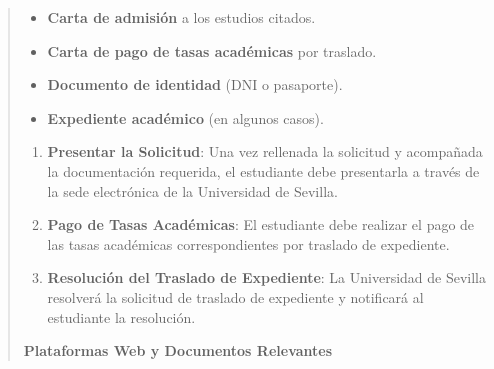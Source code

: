 \documentclass[12pt,a4paper,oneside]{report}
\begin{document}
\begin{itemize}
\begin{itemize}
\begin{quote}
\begin{itemize}
  \item \textbf{Carta de admisión} a los estudios citados.
  \item \textbf{Carta de pago de tasas académicas} por traslado.
  \item \textbf{Documento de identidad} (DNI o pasaporte).
  \item \textbf{Expediente académico} (en algunos casos).
\end{itemize}
\begin{enumerate}
  \item \textbf{Presentar la Solicitud}: Una vez rellenada la solicitud y acompañada la documentación requerida, el estudiante debe presentarla a través de la sede electrónica de la Universidad de Sevilla.
  \item \textbf{Pago de Tasas Académicas}: El estudiante debe realizar el pago de las tasas académicas correspondientes por traslado de expediente.
  \item \textbf{Resolución del Traslado de Expediente}: La Universidad de Sevilla resolverá la solicitud de traslado de expediente y notificará al estudiante la resolución.
\end{enumerate}


\noindent\textbf{Plataformas Web y Documentos Relevantes}\\


\end{quote}
\end{itemize}
\end{itemize}
\end{document}
